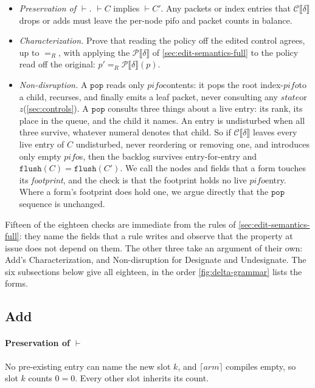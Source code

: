 \documentclass[sigplan,anonymous,review,nonacm]{acmart}
\newcommand{\pop}{\ensuremath{\mathtt{pop}}}
\newcommand{\flush}{\ensuremath{\mathtt{flush}}}
\newcommand{\csem}[1]{\mathcal{C}\llbracket #1 \rrbracket}
\newcommand{\psem}[1]{\mathcal{P}\llbracket #1 \rrbracket}
\newcommand{\eqR}{=_R}
\newcommand{\notation}[1]{\ensuremath{#1}\ifmmode\else\xspace\fi}
\newcommand{\pifo}{\notation{\mathit{pifo}}}
\newcommand{\zz}{\notation{\mathit{z}}}
\newcommand{\stt}{\notation{\mathit{state}}}
\newcommand{\Add}{\textsf{Add}}
\newcommand{\Designate}{\textsf{Designate}}
\newcommand{\Undesignate}{\textsf{Undesignate}}
\begin{document}
\begin{itemize}
\item \emph{Preservation of \(\vdash\).} \(\vdash C\) implies \(\vdash C'\).
Any packets or index entries that \(\csem{\delta}\) drops or adds must leave the per-node pifo and packet counts in balance.
\item \emph{Characterization.} Prove that reading the policy off the edited control agrees, up to \(\eqR\), with applying the \(\psem{\delta}\) of \cref{sec:edit-semantics-full} to the policy read off the original: \(p' \eqR \psem{\delta}(p)\).
\item \emph{Non-disruption.} A \pop{} reads only \pifo contents: it pops the root index-\pifo to a child, recurses, and finally emits a leaf packet, never consulting any \stt or \zz (\cref{sec:controls}).
A \pop{} consults three things about a live entry: its rank, its place in the queue, and the child it names.
An entry is undisturbed when all three survive, whatever numeral denotes that child.
So if \(\csem{\delta}\) leaves every live entry of \(C\) undisturbed, never reordering or removing one, and introduces only empty \pifo{}s, then the backlog survives entry-for-entry and \(\flush(C) = \flush(C')\).
We call the nodes and fields that a form touches its \emph{footprint}, and the check is that the footprint holds no live \pifo entry.
Where a form's footprint does hold one, we argue directly that the \pop{} sequence is unchanged.
\end{itemize}

Fifteen of the eighteen checks are immediate from the rules of \cref{sec:edit-semantics-full}: they name the fields that a rule writes and observe that the property at issue does not depend on them.
The other three take an argument of their own: \Add's Characterization, and Non-disruption for \Designate{} and \Undesignate.
The six subsections below give all eighteen, in the order \cref{fig:delta-grammar} lists the forms.

\subsection{\texorpdfstring{\Add}{Add}}\label{sec:check-add}

\paragraph{Preservation of \(\vdash\)}
No pre-existing entry can name the new slot \(k\), and \(\lceil \mathit{arm} \rceil\) compiles empty, so slot \(k\) counts \(0 = 0\).
Every other slot inherits its count.
\end{document}
